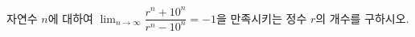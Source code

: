 자연수 $n$에 대하여 $\displaystyle\lim_{n\to\infty}\dfrac{r^n+10^n}{r^n-10^n}=-1$을 만족시키는 정수 $r$의 개수를 구하시오. 
